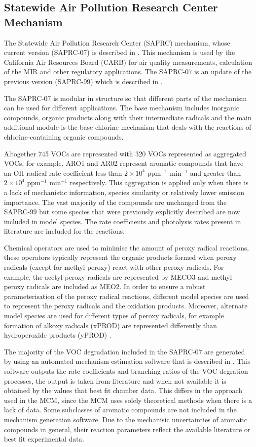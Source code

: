 \subsection{Statewide Air Pollution Research Center Mechanism}
The Statewide Air Pollution Research Center (SAPRC) mechanism, whose current version (SAPRC-07) is described in 
\citep{Carter:2010}. This mechanism is used by the California Air Resources Board (CARB) for air quality measurements, 
calculation of the MIR and other regulatory applications.  The SAPRC-07 is an update of the previous version (SAPRC-99) which 
is described in \citep{Carter:2000}. 

The SAPRC-07 is modular in structure so that different parts of the mechanism can be used for different applications. The base 
mechanism includes inorganic compounds, organic products along with their intermediate radicals and the main additional module 
is the base chlorine mechanism that deals with the reactions of chlorine-containing organic compounds. 

Altogether 745 VOCs are represented with 320 VOCs represented as aggregated VOCs, for example, ARO1 and AR02 represent aromatic
compounds that have an OH radical rate coefficient less than $2 \times 10^4$ ppm$^{-1}$ min$^{-1}$ and greater than 
$2 \times 10^4$ ppm$^{-1}$ min$^{-1}$ respectively. This aggregation is applied only when there is a lack of mechanistic 
information, species similarity or relatively lower emission importance. The vast majority of the compounds are unchanged from 
the SAPRC-99 but some species that were previously explicitly described are now included in model species. The rate 
coefficients and photolysis rates present in literature are included for the reactions. 

Chemical operators are used to minimise the amount of peroxy radical reactions, these operators typically represent the organic
products formed when peroxy radicals (except for methyl peroxy) react with other peroxy radicals. For example, the acetyl 
peroxy radicals are represented by MECO3 and methyl peroxy radicals are included as MEO2. In order to ensure a robust 
parameterisation of the peroxy radical reactions, different model species are used to represent the peroxy radicals and the 
oxidation products. Moreover, alternate model species are used for different types of peroxy radicals, for example formation of
alkoxy radicals (xPROD) are represented differently than hydroperoxide products (yPROD) \citep{Carter:2010}.

The majority of the VOC degradation included in the SAPRC-07 are generated by using an automated mechanism estimation software 
that is described in \citep{Carter:2000}. This software outputs the rate coefficients and branching ratios of the VOC degration 
processes, the output is taken from literature and when not available it is obtained by the values that best fit chamber data. 
This differs in the approach used in the MCM, since the MCM uses solely theoretical methods when there is a lack of data. Some 
subclasses of aromatic compounds are not included in the mechanism generation software. Due to the mechanisic uncertainties of 
aromatic compounds in general, their reaction parameters reflect the available literature or best fit experimental data.

